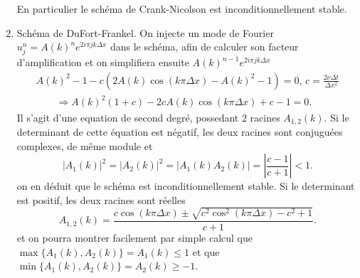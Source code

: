 \documentclass[12pt,a4paper]{article}
\begin{document}
\begin{enumerate}
    En particulier le schéma de Crank-Nicolson est inconditionnellement stable.
\item Sch\'ema de DuFort-Frankel. On injecte un mode de Fourier
  $u_j^n=A(k)^ne^{2i\pi j k\Delta x}$ dans le sch\'ema, afin de calculer
  son facteur d'amplification et on simplifiera ensuite $A(k)^{n-1}e^{2i\pi jk\Delta x}$
$$
\begin{array}{l}
A(k)^2-1-c\left(2A(k)\cos(k\pi\Delta
  x)-A(k)^2-1\right)=0,\, c=\frac{2\nu\Delta t}{\Delta x^2}\\[2ex]
\qquad \Rightarrow A(k)^2(1+c)-2cA(k)\cos(k\pi\Delta x)+c-1=0.
\end{array}
$$
Il s'agit d'une equation de second degr\'e, possedant $2$ racines
$A_{1,2}(k)$. Si le determinant de cette \'equation est n\'egatif, les
deux racines sont conjugu\'ees complexes, de m\^eme module et 
$$
|A_1(k)|^2= |A_2(k)|^2=|A_1(k)A_2(k)|=\left|\frac{c-1}{c+1}\right|<1.
$$
on en d\'eduit que le sch\'ema est inconditionnellement stable. Si le
determinant est positif, les deux racines sont r\'eelles
$$
A_{1,2}(k)=\frac{c\cos(k\pi\Delta x)\pm \sqrt{c^2\cos^2(k\pi\Delta x)-c^2+1} }{c+1}.
$$
et on pourra montrer facilement par simple calcul que $\max
\{A_1(k),A_2(k)\} = A_1(k) \le  1$ et que $\min
\{A_1(k),A_2(k)\} = A_2(k) \ge -1$.
\end{enumerate}
\end{document}
